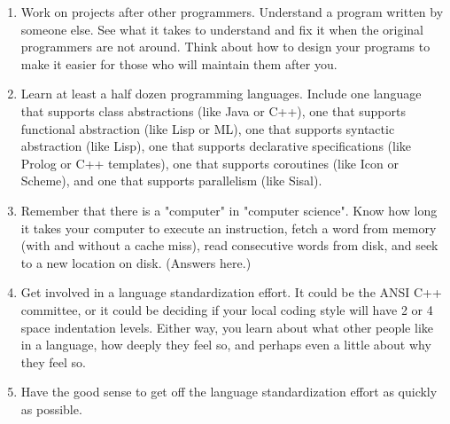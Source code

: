 \documentclass[12pt,a4paper,final,twoside,onecolumn,titlepage]{book}
\begin{document}
\begin{enumerate}
\item Work on projects after other programmers. Understand a program written by someone else. See what it takes to understand and fix it when the original programmers are not around. Think about how to design your programs to make it easier for those who will maintain them after you.
\item Learn at least a half dozen programming languages. Include one language that supports class abstractions (like Java or C++), one that supports functional abstraction (like Lisp or ML), one that supports syntactic abstraction (like Lisp), one that supports declarative specifications (like Prolog or C++ templates), one that supports coroutines (like Icon or Scheme), and one that supports parallelism (like Sisal).
\item Remember that there is a "computer" in "computer science". Know how long it takes your computer to execute an instruction, fetch a word from memory (with and without a cache miss), read consecutive words from disk, and seek to a new location on disk. (Answers here.)
\item Get involved in a language standardization effort. It could be the ANSI C++ committee, or it could be deciding if your local coding style will have 2 or 4 space indentation levels. Either way, you learn about what other people like in a language, how deeply they feel so, and perhaps even a little about why they feel so.
\item Have the good sense to get off the language standardization effort as quickly as possible.
\end{enumerate}
\end{document}
